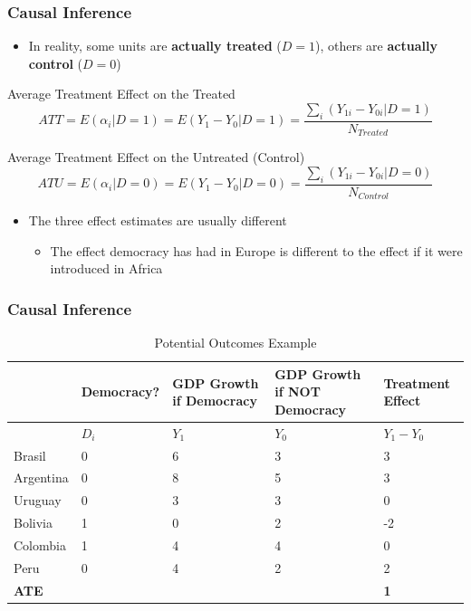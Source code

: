 \documentclass[xcolor=x11names,compress]{beamer}\usepackage[]{graphicx}\usepackage[]{color}
\renewcommand{\(}{\begin{columns}}
\renewcommand{\)}{\end{columns}}
\newcommand{\<}[1]{\begin{column}{#1}}
\renewcommand{\>}{\end{column}}
\begin{document}
\begin{frame}
\frametitle{Causal Inference}
\begin{itemize}
\item In reality, some units are \textbf{actually treated} ($D=1$), others are \textbf{actually control} ($D=0$)
\end{itemize}
\pause
\footnotesize
\begin{block}{Average Treatment Effect on the Treated}
\begin{equation}
ATT=E(\alpha_i|D=1) = E (Y_1 - Y_0|D=1) = \frac{\sum_i (Y_{1i} - Y_{0i}|D=1)}{N_{Treated}}
\end{equation}
\end{block}
\pause
\begin{block}{Average Treatment Effect on the Untreated (Control)}
\footnotesize
\begin{equation}
ATU=E(\alpha_i|D=0) = E (Y_1 - Y_0|D=0) = \frac{\sum_i (Y_{1i} - Y_{0i}|D=0)}{N_{Control}}
\end{equation}
\end{block}
\normalsize
\pause
\begin{itemize}
\item The three effect estimates are usually different
\begin{itemize}
\item The effect democracy has had in Europe is different to the effect if it were introduced in Africa
\end{itemize}
\end{itemize}
\end{frame}

\begin{frame}
\frametitle{Causal Inference}
\scriptsize
\begin{table}[htbp]
  \centering
  \caption{Potential Outcomes Example}
    \begin{tabular}{|p{1.8cm}|p{1.8cm}|p{2cm}|p{2cm}|p{2cm}|}
    \hline
          & \multicolumn{1}{p{1.8cm}|}{Democracy?} & \multicolumn{1}{p{2cm}|}{GDP Growth if Democracy} & \multicolumn{1}{p{2.2cm}|}{GDP Growth if NOT Democracy} & \textbf{Treatment Effect} \bigstrut\\
    \hline
          & \multicolumn{1}{p{1.8cm}|}{$D_i$} & \multicolumn{1}{p{2cm}|}{$Y_1$} & \multicolumn{1}{p{2.2cm}|}{$Y_0$} & \multicolumn{1}{p{1.8cm}|}{$Y_{1} - Y_{0}$} \bigstrut\\
    \hline
    Brasil & 0 & 6     & 3     & 3 \bigstrut\\
    \hline
    Argentina & 0 & 8    & 5     & 3 \bigstrut\\
    \hline
    Uruguay & 0 & 3 & 3 & 0  \bigstrut\\
    \hline
    Bolivia & 1 & 0     & 2     & -2 \bigstrut\\
    \hline
    Colombia & 1 & 4    & 4    & 0 \bigstrut\\
    \hline
    Peru & 0 & 4     & 2     & 2 \bigstrut\\
    \hline
    \textbf{ATE} & & & & \textbf{1} \bigstrut\\
    \hline
    \end{tabular}%
  \label{tab:addlabel}%
\end{table}%
\normalsize
\end{frame}
\end{document}
